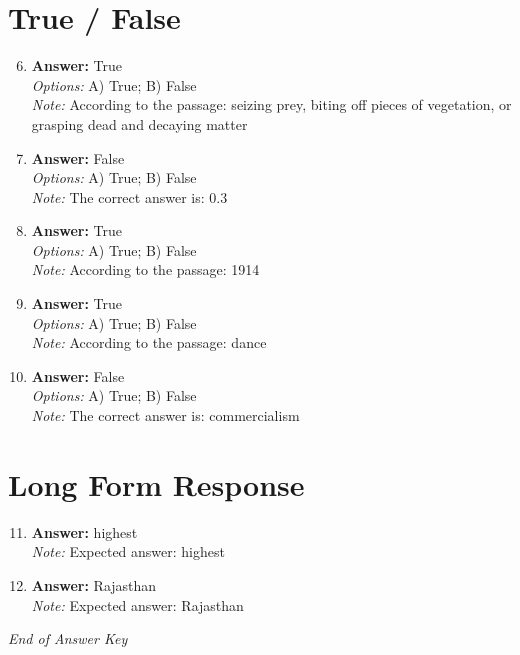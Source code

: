 \documentclass[12pt]{article}
\begin{document}
\section*{True / False}
\begin{enumerate}[label=\arabic*.]
\setcounter{enumi}{5}
\item \textbf{Answer:} True
\\ \textit{Options:} A) True; B) False
\\ \textit{Note:} According to the passage: seizing prey, biting off pieces of vegetation, or grasping dead and decaying matter
\item \textbf{Answer:} False
\\ \textit{Options:} A) True; B) False
\\ \textit{Note:} The correct answer is: 0.3
\item \textbf{Answer:} True
\\ \textit{Options:} A) True; B) False
\\ \textit{Note:} According to the passage: 1914
\item \textbf{Answer:} True
\\ \textit{Options:} A) True; B) False
\\ \textit{Note:} According to the passage: dance
\item \textbf{Answer:} False
\\ \textit{Options:} A) True; B) False
\\ \textit{Note:} The correct answer is: commercialism
\end{enumerate}

\section*{Long Form Response}
\begin{enumerate}[label=\arabic*.]
\setcounter{enumi}{10}
\item \textbf{Answer:} highest
\\ \textit{Note:} Expected answer: highest
\item \textbf{Answer:} Rajasthan
\\ \textit{Note:} Expected answer: Rajasthan
\end{enumerate}

\vfill
\noindent\textit{End of Answer Key}
\end{document}
